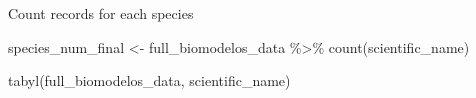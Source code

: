 \documentclass[
]{article}
\newenvironment{Shaded}{\begin{snugshade}}{\end{snugshade}}
\newcommand{\FunctionTok}[1]{\textcolor[rgb]{0.00,0.00,0.00}{#1}}
\newcommand{\NormalTok}[1]{#1}
\newcommand{\OtherTok}[1]{\textcolor[rgb]{0.56,0.35,0.01}{#1}}
\newcommand{\SpecialCharTok}[1]{\textcolor[rgb]{0.00,0.00,0.00}{#1}}
\begin{document}
Count records for each species

\begin{Shaded}
\begin{Highlighting}[]
\NormalTok{species\_num\_final }\OtherTok{\textless{}{-}}\NormalTok{ full\_biomodelos\_data }\SpecialCharTok{\%\textgreater{}\%}
  \FunctionTok{count}\NormalTok{(scientific\_name) }

\FunctionTok{tabyl}\NormalTok{(full\_biomodelos\_data, scientific\_name)}
\end{Highlighting}
\end{Shaded}
\end{document}
